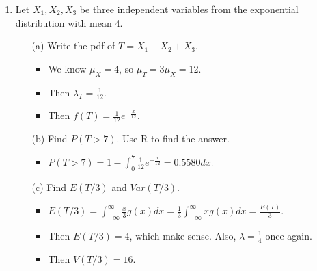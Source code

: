 \documentclass{article}
\begin{document}
\begin{enumerate}
\item Let  $X_1,X_2, X_3$ be three independent variables from the exponential distribution with mean 4.
    \begin{itemize}
    \item [(a)] Write the pdf of $T=X_1+X_2+X_3$.
        \begin{itemize}
        \item We know $\mu_X = 4$, so $\mu_T = 3\mu_X = 12$.
        \item Then $\lambda_T = \frac{1}{12}$.
        \item Then $f(T) = \frac{1}{12} e^{-\frac{x}{12}}$.
        \end{itemize}
    \item [(b)] Find $P(T>7)$. Use R to find the answer.
        \begin{itemize}
        \item $P(T > 7) = 1 - \int_0^7 \frac{1}{12} e^{-\frac{x}{12}} = 0.5580 dx$.
        \end{itemize}
    \item [(c)] Find $E(T/3)$ and $Var(T/3)$.
        \begin{itemize}
        \item $E(T/3) = \int_{-\infty}^{\infty} \frac{x}{3} g(x) dx = \frac{1}{3} \int_{-\infty}^{\infty} x g(x) dx = \frac{E(T)}{3}$.
        \item Then $E(T/3) = 4$, which make sense. Also, $\lambda = \frac{1}{4}$ once again.
        \item Then $V(T/3) = 16$.
        \end{itemize}
    \end{itemize}


\end{enumerate}
\end{document}
